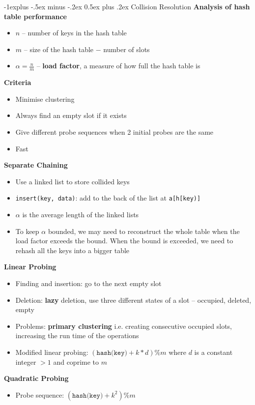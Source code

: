 \documentclass[10pt,landscape,a4paper]{article}
\makeatletter
\renewcommand{\subsection}{\@startsection{subsection}{2}{0mm}%
                                {-1explus -.5ex minus -.2ex}%
                                {0.5ex plus .2ex}%
                                {\normalfont\normalsize\bfseries}}
\makeatother
\begin{document}
\begin{multicols}{4}
\subsection{Collision Resolution}
\textbf{Analysis of hash table performance}
\begin{itemize}
	\item $n$ -- number of keys in the hash table
	\item $m$ -- size of the hash table  $-$ number of slots
	\item $\alpha=\frac{n}{m}$ -- \textbf{load factor}, a measure of how full the hash table is
\end{itemize}
\textbf{Criteria}
\begin{itemize}
	\item Minimise clustering
	\item Always find an empty slot if it exists
	\item Give different probe sequences when 2 initial probes are the same
	\item Fast
\end{itemize}
\textbf{Separate Chaining}
\begin{itemize}
	\item Use a linked list to store collided keys
	\item \texttt{insert(key, data)}: add to the back of the list at \texttt{a[h[key)]}
	\item $\alpha$ is the average length of the linked lists
	\item To keep $\alpha$ bounded, we may need to reconstruct the whole table when the load factor exceeds the bound. When the bound is exceeded, we need to rehash all the keys into a bigger table
\end{itemize}
\textbf{Linear Probing}
\begin{itemize}
	\item Finding and insertion: go to the next empty slot
	\item Deletion: \textbf{lazy} deletion, use three different states of a slot -- occupied, deleted, empty
	\item Problems: \textbf{primary clustering} i.e. creating consecutive occupied slots, increasing the run time of the operations
	\item Modified linear probing: $(\texttt{hash(key)}+k*d)\%m$ where $d$ is a constant integer  $>1$ and coprime to  $m$
\end{itemize}
\textbf{Quadratic Probing}
\begin{itemize}
	\item Probe sequence: $(\texttt{hash(key)}+k^2)\%m$

\end{itemize}
\end{multicols}
\end{document}
